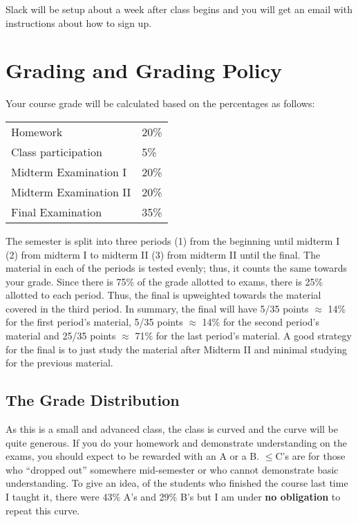 \documentclass[12pt]{article}
\newcommand{\inred}[1]{\color{red}\textbf{#1} \color{black}}
\newcommand{\qu}[1]{``#1''}
\begin{document}
Slack will be setup about a week after class begins and you will get an email with instructions about how to sign up.


\section*{Grading and Grading Policy}\label{sec:grading}

Your course grade will be calculated based on the percentages as follows: 

\begin{table}[h]
\centering
\begin{tabular}{l|l}
Homework & 20\% \\
Class participation & 5\% \\
Midterm Examination I & 20\%\\
Midterm Examination II & 20\%\\
Final Examination & 35\%
\end{tabular}
\end{table}
\FloatBarrier

The semester is split into three periods (1) from the beginning until midterm I (2) from midterm I to midterm II (3) from midterm II until the final. The material in each of the periods is tested evenly; thus, it counts the same towards your grade. Since there is 75\% of the grade allotted to exams, there is 25\% allotted to each period. Thus, the final is upweighted towards the material covered in the third period. In summary, the final will have 5/35 points $\approx$ 14\% for the first period's material, 5/35 points $\approx$ 14\% for the second period's material and 25/35 points $\approx$ 71\% for the last period's material. A good strategy for the final is to just study the material after Midterm II and minimal studying for the previous material.

\subsection*{The Grade Distribution}

As this is a small and advanced class, the class is curved and the curve will be quite generous. If you do your homework and demonstrate understanding on the exams, you should expect to be rewarded with an A or a B. $\leq$C's are for those who \qu{dropped out} somewhere mid-semester or who cannot demonstrate basic understanding. To give an idea, of the students who finished the course last time I taught it, there were 43\% A's and 29\% B's but I am under \inred{no obligation} to repeat this curve.
\end{document}
